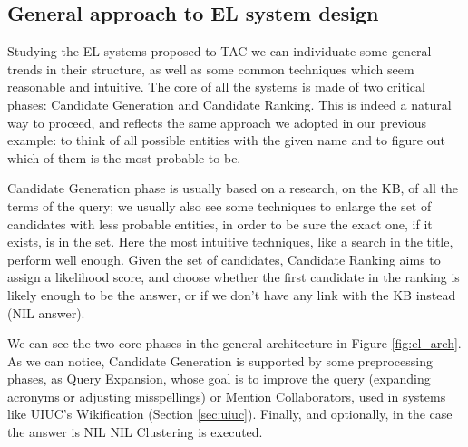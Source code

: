 \documentclass[a4paper,11pt]{report}
\begin{document}
\subsection{General approach to EL system design}
Studying the EL systems proposed to TAC we can individuate some general trends in their structure, as well as some common techniques which seem reasonable and intuitive.
The core of all the systems is made of two critical phases: Candidate Generation and Candidate Ranking. This is indeed a natural way to proceed, and reflects the same approach we adopted in our previous example: to think of all possible entities with the given name and to figure out which of them is the most probable to be.

Candidate Generation phase is usually based on a research, on the KB, of all the terms of the query; we usually also see some techniques to enlarge the set of candidates with less probable entities, in order to be sure the exact one, if it exists, is in the set. Here the most intuitive techniques, like a search in the title, perform well enough.
Given the set of candidates, Candidate Ranking aims to assign a likelihood score, and choose whether the first candidate in the ranking is likely enough to be the answer, or if we don't have any link with the KB instead (NIL answer).

We can see the two core phases in the general architecture in Figure \ref{fig:el_arch}. As we can notice, Candidate Generation is supported by some preprocessing phases, as Query Expansion, whose goal is to improve the query (expanding acronyms or adjusting misspellings) or Mention Collaborators, used in systems like UIUC's Wikification (Section \ref{sec:uiuc}). %
 Finally, and optionally, in the case the answer is NIL NIL Clustering is executed.
 
\end{document}
